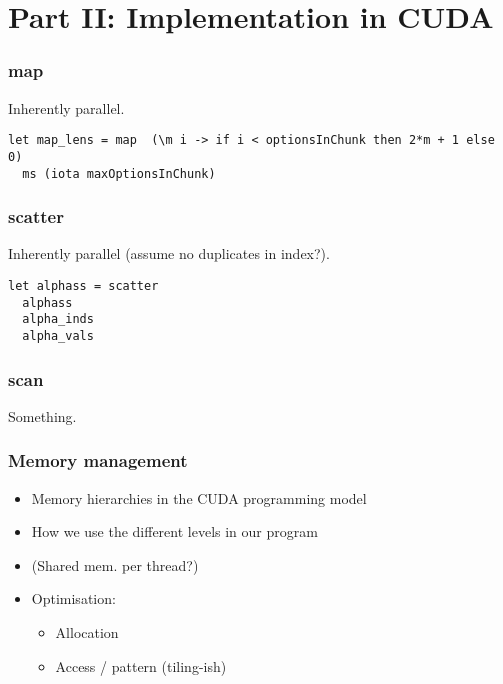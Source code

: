 \section{Part II: Implementation in CUDA}

\begin{frame}[fragile]
  \frametitle{map}
%
Inherently parallel.
%
\begin{lstlisting}
let map_lens = map  (\m i -> if i < optionsInChunk then 2*m + 1 else 0)
  ms (iota maxOptionsInChunk)
\end{lstlisting}
%
\end{frame}

\begin{frame}[fragile]
  \frametitle{scatter}
%
Inherently parallel (assume no duplicates in index?).
%
%
\begin{lstlisting}
let alphass = scatter
  alphass
  alpha_inds
  alpha_vals
\end{lstlisting}
%
\end{frame}

\begin{frame}
  \frametitle{scan}
%
Something.
%
\end{frame}

\begin{frame}
  \frametitle{Memory management}
  \begin{itemize}
    \item Memory hierarchies in the CUDA programming model
    \item How we use the different levels in our program
    \item (Shared mem. per thread?)
    \item Optimisation:
      \begin{itemize}
        \item Allocation
        \item Access / pattern (tiling-ish)
      \end{itemize}
  \end{itemize}
\end{frame}
